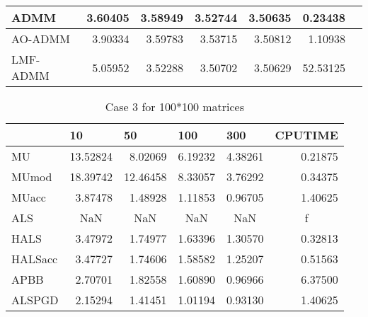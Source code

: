 \documentclass{article}
\begin{document}
\begin{table}[H]
\begin{tabular}{|l|r|r|r|r|r|l|}
		ADMM     & 3.60405                 & 3.58949                 & 3.52744                  & 3.50635                  & 0.23438                      &  \\ \hline
		AO-ADMM  & 3.90334                 & 3.59783                 & 3.53715                  & 3.50812                  & 1.10938                      &  \\ \hline
		LMF-ADMM & 5.05952                 & 3.52288                 & 3.50702                  & 3.50629                  & 52.53125                     &  \\ \hline
	\end{tabular}
\end{table}


\begin{table}[H]
		\caption{Case 3 for 100*100 matrices}
		\centering
	\begin{tabular}{|l|r|r|r|r|r|}
		\hline
		& \multicolumn{1}{l|}{10}  & \multicolumn{1}{l|}{50}  & \multicolumn{1}{l|}{100} & \multicolumn{1}{l|}{300} & \multicolumn{1}{l|}{CPUTIME} \\ \hline
		MU       & 13.52824                 & 8.02069                  & 6.19232                  & 4.38261                  & 0.21875                      \\ \hline
		MUmod    & 18.39742                 & 12.46458                 & 8.33057                  & 3.76292                  & 0.34375                      \\ \hline
		MUacc    & 3.87478                  & 1.48928                  & 1.11853                  & 0.96705                  & 1.40625                      \\ \hline
		ALS      & \multicolumn{1}{c|}{NaN} & \multicolumn{1}{c|}{NaN} & \multicolumn{1}{c|}{NaN} & \multicolumn{1}{c|}{NaN} & \multicolumn{1}{c|}{f}       \\ \hline
		HALS     & 3.47972                  & 1.74977                  & 1.63396                  & 1.30570                  & 0.32813                      \\ \hline
		HALSacc  & 3.47727                  & 1.74606                  & 1.58582                  & 1.25207                  & 0.51563                      \\ \hline
		APBB     & 2.70701                  & 1.82558                  & 1.60890                  & 0.96966                  & 6.37500                      \\ \hline
		ALSPGD   & 2.15294                  & 1.41451                  & 1.01194                  & 0.93130                  & 1.40625                      \\ \hline

\end{tabular}
\end{table}
\end{document}
